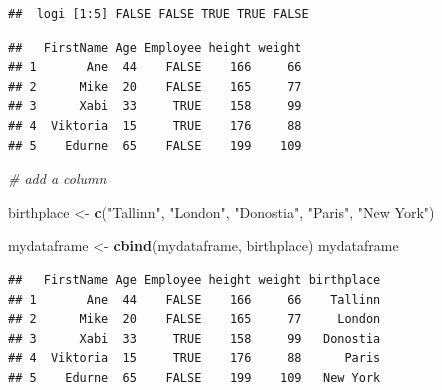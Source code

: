 \documentclass[]{book}
\newenvironment{Shaded}{\begin{snugshade}}{\end{snugshade}}
\newcommand{\KeywordTok}[1]{\textcolor[rgb]{0.13,0.29,0.53}{\textbf{{#1}}}}
\newcommand{\DecValTok}[1]{\textcolor[rgb]{0.00,0.00,0.81}{{#1}}}
\newcommand{\StringTok}[1]{\textcolor[rgb]{0.31,0.60,0.02}{{#1}}}
\newcommand{\CommentTok}[1]{\textcolor[rgb]{0.56,0.35,0.01}{\textit{{#1}}}}
\newcommand{\NormalTok}[1]{{#1}}
\begin{document}
\begin{verbatim}
##  logi [1:5] FALSE FALSE TRUE TRUE FALSE
\end{verbatim}

\begin{Shaded}
\end{Shaded}

\begin{verbatim}
##   FirstName Age Employee height weight
## 1       Ane  44    FALSE    166     66
## 2      Mike  20    FALSE    165     77
## 3      Xabi  33     TRUE    158     99
## 4  Viktoria  15     TRUE    176     88
## 5    Edurne  65    FALSE    199    109
\end{verbatim}

\begin{Shaded}
\begin{Highlighting}[]
\CommentTok{# add a column }

\NormalTok{birthplace <-}\StringTok{ }\KeywordTok{c}\NormalTok{(}\StringTok{"Tallinn"}\NormalTok{, }\StringTok{"London"}\NormalTok{, }\StringTok{"Donostia"}\NormalTok{, }\StringTok{"Paris"}\NormalTok{, }\StringTok{"New York"}\NormalTok{)}

\NormalTok{mydataframe <-}\StringTok{ }\KeywordTok{cbind}\NormalTok{(mydataframe, birthplace)}
\NormalTok{mydataframe}
\end{Highlighting}
\end{Shaded}

\begin{verbatim}
##   FirstName Age Employee height weight birthplace
## 1       Ane  44    FALSE    166     66    Tallinn
## 2      Mike  20    FALSE    165     77     London
## 3      Xabi  33     TRUE    158     99   Donostia
## 4  Viktoria  15     TRUE    176     88      Paris
## 5    Edurne  65    FALSE    199    109   New York
\end{verbatim}
\end{document}
